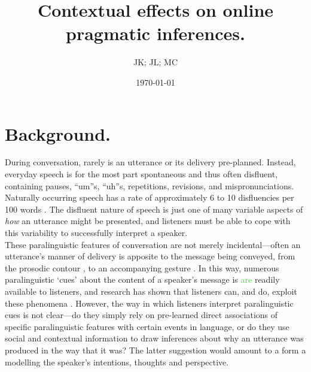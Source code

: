 \documentclass[man]{apa6}
\newcommand\thenote[1]{\textcolor{LimeGreen}{#1}}
\begin{document}
\title{Contextual effects on online pragmatic inferences.}
\author{JK; JL; MC}
\date{\today}
\maketitle

\section{Background.}
During conversation, rarely is an utterance or its delivery pre-planned.
Instead, everyday speech is for the most part spontaneous and thus often disfluent, containing pauses, ``um''s, ``uh''s, repetitions, revisions, and mispronunciations. 
Naturally occurring speech has a rate of approximately 6 to 10 disfluencies per 100 words \citep{Bortfeld2001, FoxTree1995}.
The disfluent nature of speech is just one of many variable aspects of \textit{how} an utterance might be presented, and listeners must be able to cope with this variability to successfully interpret a speaker.\\

These paralinguistic features of conversation are not merely incidental---often an utterance's manner of delivery is apposite to the message being conveyed, from the prosodic contour \citep{Fernald1991}, to an accompanying gesture \citep{Alibali2001}. 
In this way, numerous paralinguistic `cues' about the content of a speaker's message is \thenote{are} readily available to listeners, and research has shown that listeners can, and do, exploit these phenomena \citep{Corley2007, Barr2001, Frazier2006}. 
However, the way in which listeners interpret paralinguistic cues is not clear---do they simply rely on pre-learned direct associations of specific paralinguistic features with certain events in language, or do they use social and contextual information to draw inferences about why an utterance was produced in the way that it was? The latter suggestion would amount to a form a modelling the speaker's intentions, thoughts and perspective.\\
\end{document}
